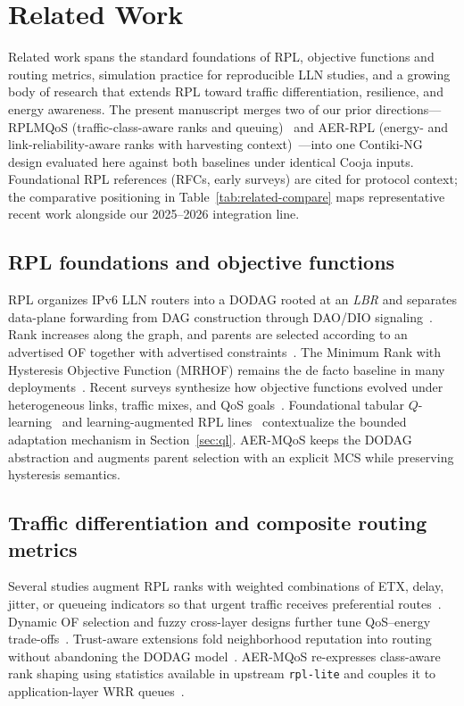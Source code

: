 \section{Related Work}
\label{sec:related}

Related work spans the standard foundations of RPL, objective functions and routing metrics, simulation practice for reproducible LLN studies, and a growing body of research that extends RPL toward traffic differentiation, resilience, and energy awareness. The present manuscript merges two of our prior directions---RPLMQoS (traffic-class-aware ranks and queuing)~\cite{belacel2025rplmqos} and AER-RPL (energy- and link-reliability-aware ranks with harvesting context)~\cite{belacel2025aerrpl}---into one Contiki-NG design evaluated here against both baselines under identical Cooja inputs. Foundational RPL references (RFCs, early surveys) are cited for protocol context; the comparative positioning in Table~\ref{tab:related-compare} maps representative recent work alongside our 2025--2026 integration line.

\subsection{RPL foundations and objective functions}
RPL organizes IPv6 LLN routers into a DODAG rooted at an \emph{LBR} and separates data-plane forwarding from DAG construction through DAO/DIO signaling~\cite{rfc6550}. Rank increases along the graph, and parents are selected according to an advertised OF together with advertised constraints~\cite{rfc6551}. The Minimum Rank with Hysteresis Objective Function (MRHOF) remains the de facto baseline in many deployments~\cite{rfc6719}. Recent surveys synthesize how objective functions evolved under heterogeneous links, traffic mixes, and QoS goals~\cite{alnajjar2025ofsurvey,kim2017rplsurvey,lamaazi2020rplreview}. Foundational tabular $Q$-learning~\cite{watkins1992qlearning} and learning-augmented RPL lines~\cite{zahedy2024rirpl,wang2024drplcomnet,harishkumar2025deeplightrpl} contextualize the bounded adaptation mechanism in Section~\ref{sec:ql}. AER-MQoS keeps the DODAG abstraction and augments parent selection with an explicit MCS while preserving hysteresis semantics.

\subsection{Traffic differentiation and composite routing metrics}
Several studies augment RPL ranks with weighted combinations of ETX, delay, jitter, or queueing indicators so that urgent traffic receives preferential routes~\cite{nassar2018qosrpl,solapure2024rplofs,maheshwari2024fuzzyrpl,wakili2024mlrpl}. Dynamic OF selection and fuzzy cross-layer designs further tune QoS--energy trade-offs~\cite{solapure2024rplofs,poornima2025fuzzyclrpl}. Trust-aware extensions fold neighborhood reputation into routing without abandoning the DODAG model~\cite{pishdar2021pccrpl,farooq2022trustrpl,alamiedy2023rplattacks}. AER-MQoS re-expresses class-aware rank shaping using statistics available in upstream \texttt{rpl-lite} and couples it to application-layer WRR queues~\cite{oikonomou2022contik}.

